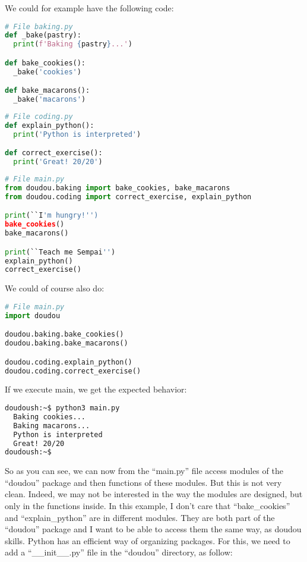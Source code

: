 \vspace{5mm}


We could for example have the following code:

\begin{lstlisting}[language=python]
# File baking.py
def _bake(pastry):
  print(f'Baking {pastry}...')

def bake_cookies():
  _bake('cookies')

def bake_macarons():
  _bake('macarons')
\end{lstlisting}

\begin{lstlisting}[language=python]
# File coding.py
def explain_python():
  print('Python is interpreted')

def correct_exercise():
  print('Great! 20/20')
\end{lstlisting}

\begin{lstlisting}[language=python]
# File main.py
from doudou.baking import bake_cookies, bake_macarons
from doudou.coding import correct_exercise, explain_python

print(``I'm hungry!'')
bake_cookies()
bake_macarons()

print(``Teach me Sempai'')
explain_python()
correct_exercise()
\end{lstlisting}

We could of course also do:
\begin{lstlisting}[language=python]
# File main.py
import doudou

doudou.baking.bake_cookies()
doudou.baking.bake_macarons()

doudou.coding.explain_python()
doudou.coding.correct_exercise()
\end{lstlisting}

If we execute main, we get the expected behavior:

\begin{lstlisting}[language=bash]
doudoush:~$ python3 main.py
  Baking cookies...
  Baking macarons...
  Python is interpreted
  Great! 20/20
doudoush:~$
\end{lstlisting}

So as you can see, we can now from the ``main.py'' file access modules of the ``doudou''
package and then functions of these modules. But this is not very clean. Indeed, we may
not be interested in the way the modules are designed, but only in the functions inside.
In this example, I don't care that ``bake\_cookies'' and ``explain\_python'' are in
different modules. They are both part of the ``doudou'' package and I want to be able to
access them the same way, as doudou skills. Python has an efficient way of organizing
packages. For this, we need to add a ``\_\_init\_\_.py'' file in the ``doudou'' directory,
as follow:

